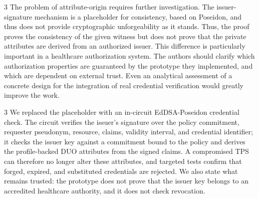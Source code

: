\begin{reviewcomment}{3}
	The problem of attribute-origin requires further investigation.
	The issuer-signature mechanism is a placeholder for consistency, based on Poseidon, and thus does not provide cryptographic unforgeability as it stands.
	Thus, the proof proves the consistency of the given witness but does not prove that the private attributes are derived from an authorized issuer.
	This difference is particularly important in a healthcare authorization system.
	The authors should clarify which authorization properties are guaranteed by the prototype they implemented, and which are dependent on external trust.
	Even an analytical assessment of a concrete design for the integration of real credential verification would greatly improve the work.
\end{reviewcomment}

\begin{reviewresponse}{3}
	We replaced the placeholder with an in-circuit EdDSA-Poseidon credential check.
	The circuit verifies the issuer's signature over the policy commitment, requester pseudonym, resource, claims, validity interval, and credential identifier; it checks the issuer key against a commitment bound to the policy and derives the profile-backed DUO attributes from the signed claims.
	A compromised TPS can therefore no longer alter these attributes, and targeted tests confirm that forged, expired, and substituted credentials are rejected.
	We also state what remains trusted: the prototype does not prove that the issuer key belongs to an accredited healthcare authority, and it does not check revocation.

\end{reviewresponse}
